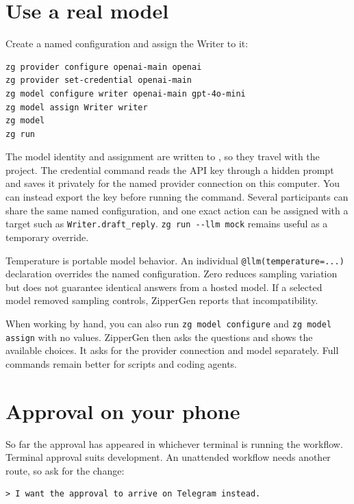 \documentclass[11pt,a4paper]{article}
\begin{document}
\section{Use a real model}

Create a named configuration and assign the Writer to it:

\begin{lstlisting}[style=shell]
zg provider configure openai-main openai
zg provider set-credential openai-main
zg model configure writer openai-main gpt-4o-mini
zg model assign Writer writer
zg model
zg run
\end{lstlisting}

The model identity and assignment are written to , so they
travel with the project. The credential command reads the API key through a
hidden prompt and saves it privately for the named provider connection on this
computer.
You can instead export the key before running the command. Several
participants can share the same named configuration, and one exact action can
be assigned with a target such as \texttt{Writer.draft\_reply}.
\texttt{zg run -{}-llm mock} remains useful as a temporary override.

Temperature is portable model behavior. An individual
\texttt{@llm(temperature=...)} declaration overrides the named configuration.
Zero reduces sampling variation but does not guarantee identical answers from
a hosted model. If a selected model removed sampling controls, ZipperGen
reports that incompatibility.

When working by hand, you can also run \texttt{zg model configure} and
\texttt{zg model assign} with no values. ZipperGen then asks the questions and
shows the available choices. It asks for the provider connection and model
separately. Full commands remain better for scripts and coding agents.

\section{Approval on your phone}

So far the approval has appeared in whichever terminal is running the workflow.
Terminal approval suits development. An unattended workflow needs another
route, so ask for the change:

\begin{lstlisting}[style=agent]
> I want the approval to arrive on Telegram instead.
\end{lstlisting}
\end{document}
